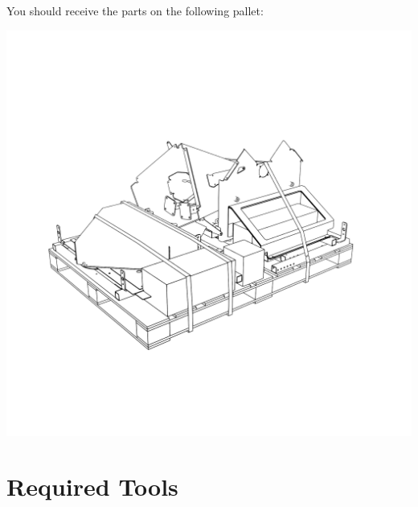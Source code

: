 \documentclass[a5paper,portrait]{article}
\begin{document}
You should receive the parts on the following pallet:

\begin{center}
  \includegraphics[width=1\textwidth]{../images/delivery.png}
\end{center}


\section*{Required Tools}

\end{document}
